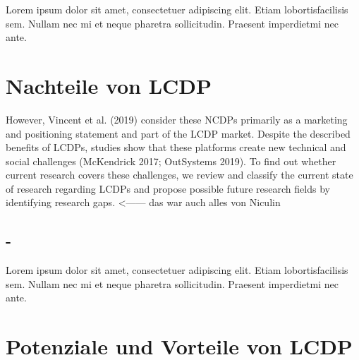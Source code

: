 \documentclass{article}
\begin{document}
	
	
	 
	Lorem  ipsum  dolor  sit  amet,  consectetuer  adipiscing  
	elit.   Etiam  lobortisfacilisis sem.  Nullam nec mi et 
	neque pharetra sollicitudin.  Praesent imperdietmi nec ante. 
	
	\section{Nachteile von LCDP}
	However, Vincent et al. (2019) consider these NCDPs primarily as a marketing and positioning statement and part of the LCDP market. Despite the described benefits of LCDPs, studies show that these platforms create new technical and social challenges (McKendrick 2017; OutSystems 2019). To find out whether current research covers these challenges, we
	review and classify the current state of research regarding LCDPs and propose possible future research fields by identifying research gaps. <------ das war auch alles von Niculin
	
	\subsection{-}	
	Lorem  ipsum  dolor  sit  amet,  consectetuer  adipiscing  
	elit.   Etiam  lobortisfacilisis sem.  Nullam nec mi et 
	neque pharetra sollicitudin.  Praesent imperdietmi nec ante.  
	
	\section{Potenziale und Vorteile von LCDP}
	
\end{document}
